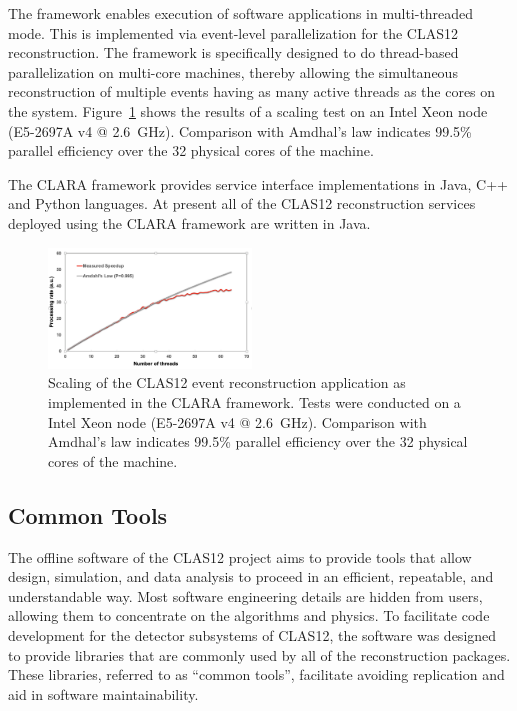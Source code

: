 The framework enables execution of software applications in multi-threaded mode. This is implemented via
event-level parallelization for the CLAS12 reconstruction. The framework is specifically designed to do
thread-based parallelization on multi-core machines, thereby allowing the simultaneous reconstruction of multiple
events having as many active threads as the cores on the system. Figure~\ref{fig:scaling} shows the results of a
scaling test on an Intel Xeon node (E5-2697A v4 @ 2.6~GHz). Comparison with Amdhal's law indicates 99.5\%
parallel efficiency over the 32 physical cores of the machine.

The CLARA framework provides service interface implementations in Java, C++ and Python languages. At present all
of the CLAS12 reconstruction services deployed using the CLARA framework are written in Java.

\begin{figure}
\centering
\includegraphics[width=0.48\textwidth]{pics/scaling.png}
\caption{Scaling of the CLAS12 event reconstruction application as implemented in the CLARA framework. Tests
  were conducted on a Intel Xeon node (E5-2697A v4 @ 2.6~GHz). Comparison with Amdhal's law indicates 99.5\%
  parallel efficiency over the 32 physical cores of the machine.}
\label{fig:scaling}
\end{figure}

\subsection{Common Tools}
\label{common-tools}

The offline software of the CLAS12 project aims to provide tools that allow design, simulation, and data analysis
to proceed in an efficient, repeatable, and understandable way. Most  software engineering details are hidden from
users, allowing them to concentrate on the algorithms and physics. To facilitate code development for the detector
subsystems of CLAS12, the software was designed to provide libraries that are commonly used by all of the
reconstruction packages.  These libraries, referred to as ``common tools'', facilitate avoiding replication and aid
in software maintainability.

